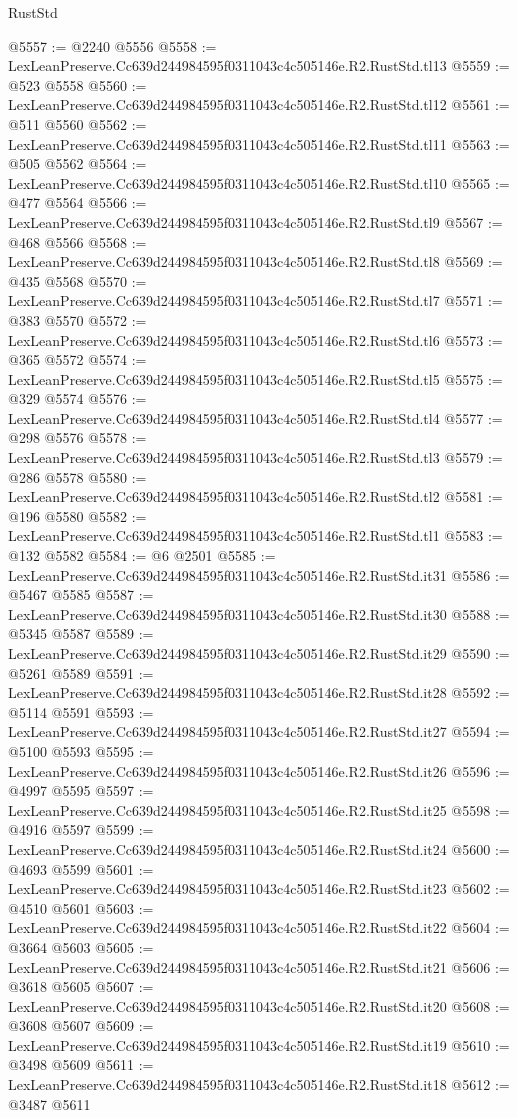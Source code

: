 \begin{lexlean}{RustStd}
\begin{coremodule}
@5557 := @2240 @5556
@5558 := LexLeanPreserve.Cc639d244984595f0311043c4c505146e.R2.RustStd.tl13
@5559 := @523 @5558
@5560 := LexLeanPreserve.Cc639d244984595f0311043c4c505146e.R2.RustStd.tl12
@5561 := @511 @5560
@5562 := LexLeanPreserve.Cc639d244984595f0311043c4c505146e.R2.RustStd.tl11
@5563 := @505 @5562
@5564 := LexLeanPreserve.Cc639d244984595f0311043c4c505146e.R2.RustStd.tl10
@5565 := @477 @5564
@5566 := LexLeanPreserve.Cc639d244984595f0311043c4c505146e.R2.RustStd.tl9
@5567 := @468 @5566
@5568 := LexLeanPreserve.Cc639d244984595f0311043c4c505146e.R2.RustStd.tl8
@5569 := @435 @5568
@5570 := LexLeanPreserve.Cc639d244984595f0311043c4c505146e.R2.RustStd.tl7
@5571 := @383 @5570
@5572 := LexLeanPreserve.Cc639d244984595f0311043c4c505146e.R2.RustStd.tl6
@5573 := @365 @5572
@5574 := LexLeanPreserve.Cc639d244984595f0311043c4c505146e.R2.RustStd.tl5
@5575 := @329 @5574
@5576 := LexLeanPreserve.Cc639d244984595f0311043c4c505146e.R2.RustStd.tl4
@5577 := @298 @5576
@5578 := LexLeanPreserve.Cc639d244984595f0311043c4c505146e.R2.RustStd.tl3
@5579 := @286 @5578
@5580 := LexLeanPreserve.Cc639d244984595f0311043c4c505146e.R2.RustStd.tl2
@5581 := @196 @5580
@5582 := LexLeanPreserve.Cc639d244984595f0311043c4c505146e.R2.RustStd.tl1
@5583 := @132 @5582
@5584 := @6 @2501
@5585 := LexLeanPreserve.Cc639d244984595f0311043c4c505146e.R2.RustStd.it31
@5586 := @5467 @5585
@5587 := LexLeanPreserve.Cc639d244984595f0311043c4c505146e.R2.RustStd.it30
@5588 := @5345 @5587
@5589 := LexLeanPreserve.Cc639d244984595f0311043c4c505146e.R2.RustStd.it29
@5590 := @5261 @5589
@5591 := LexLeanPreserve.Cc639d244984595f0311043c4c505146e.R2.RustStd.it28
@5592 := @5114 @5591
@5593 := LexLeanPreserve.Cc639d244984595f0311043c4c505146e.R2.RustStd.it27
@5594 := @5100 @5593
@5595 := LexLeanPreserve.Cc639d244984595f0311043c4c505146e.R2.RustStd.it26
@5596 := @4997 @5595
@5597 := LexLeanPreserve.Cc639d244984595f0311043c4c505146e.R2.RustStd.it25
@5598 := @4916 @5597
@5599 := LexLeanPreserve.Cc639d244984595f0311043c4c505146e.R2.RustStd.it24
@5600 := @4693 @5599
@5601 := LexLeanPreserve.Cc639d244984595f0311043c4c505146e.R2.RustStd.it23
@5602 := @4510 @5601
@5603 := LexLeanPreserve.Cc639d244984595f0311043c4c505146e.R2.RustStd.it22
@5604 := @3664 @5603
@5605 := LexLeanPreserve.Cc639d244984595f0311043c4c505146e.R2.RustStd.it21
@5606 := @3618 @5605
@5607 := LexLeanPreserve.Cc639d244984595f0311043c4c505146e.R2.RustStd.it20
@5608 := @3608 @5607
@5609 := LexLeanPreserve.Cc639d244984595f0311043c4c505146e.R2.RustStd.it19
@5610 := @3498 @5609
@5611 := LexLeanPreserve.Cc639d244984595f0311043c4c505146e.R2.RustStd.it18
@5612 := @3487 @5611

\end{coremodule}
\end{lexlean}
